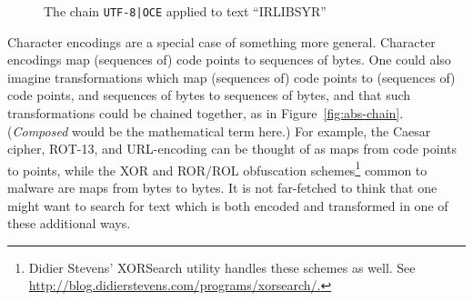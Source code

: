 \documentclass[5p,final,number,sort&compress]{elsarticle}
\begin{document}
\begin{figure*}[ht]
\centering
\small
{}
\caption{The chain \texttt{UTF-8|OCE} applied to text ``IRLIBSYR''\label{fig:concrete-chain}}
\end{figure*}

Character encodings are a special case of something more general. Character encodings map (sequences of) code points to sequences of bytes. One could also imagine transformations which map (sequences of) code points to (sequences of) code points, and sequences of bytes to sequences of bytes, and that such transformations could be chained together, as in Figure~\ref{fig:abs-chain}. (\emph{Composed} would be the mathematical term here.) For example, the Caesar cipher, ROT-13, and URL-encoding can be thought of as maps from code points to points, while the XOR and ROR/ROL obfuscation schemes\footnote{Didier Stevens' XORSearch utility handles these schemes as well. See \url{http://blog.didierstevens.com/programs/xorsearch/.}} common to malware are maps from bytes to bytes. It is not far-fetched to think that one might want to search for text which is both encoded and transformed in one of these additional ways.
\end{document}
